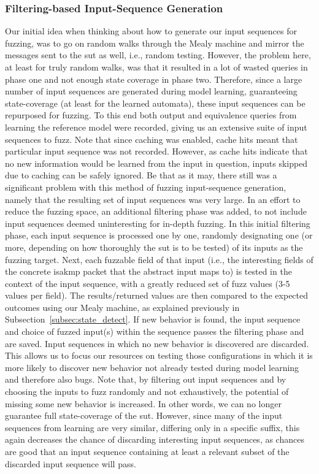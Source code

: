 \subsubsection{Filtering-based Input-Sequence Generation} \label{subsubsec:fuzz_filtering}
Our initial idea when thinking about how to generate our input sequences for fuzzing, was to go on random walks through the Mealy machine and mirror the messages sent to the \ac{sut} as well, i.e., random testing. However, the problem here, at least for truly random walks, was that it resulted in a lot of wasted queries in phase one and not enough state coverage in phase two. Therefore, since a large number of input sequences are generated during model learning, guaranteeing state-coverage (at least for the learned automata), these input sequences can be repurposed for fuzzing. To this end both output and equivalence queries from learning the reference model were recorded, giving us an extensive suite of input sequences to fuzz. Note that since caching was enabled, cache hits meant that particular input sequence was not recorded. However, as cache hits indicate that no new information would be learned from the input in question, inputs skipped due to caching can be safely ignored. Be that as it may, there still was a significant problem with this method of fuzzing input-sequence generation, namely that the resulting set of input sequences was very large. In an effort to reduce the fuzzing space, an additional filtering phase was added, to not include input sequences deemed uninteresting for in-depth fuzzing. In this initial filtering phase, each input sequence is processed one by one, randomly designating one (or more, depending on how thoroughly the \ac{sut} is to be tested) of its inputs as the fuzzing target. Next, each fuzzable field of that input (i.e., the interesting fields of the concrete \ac{isakmp} packet that the abstract input maps to) is tested in the context of the input sequence, with a greatly reduced set of fuzz values (3-5 values per field). The results/returned values are then compared to the expected outcomes using our Mealy machine, as explained previously in Subsection~\ref{subsec:state_detect}. If new behavior is found, the input sequence and choice of fuzzed input(s) within the sequence passes the filtering phase and are saved. Input sequences in which no new behavior is discovered are discarded. This allows us to focus our resources on testing those configurations in which it is more likely to discover new behavior not already tested during model learning and therefore also bugs.
Note that, by filtering out input sequences and by choosing the inputs to fuzz randomly and not exhaustively, the potential of missing some new behavior is increased. In other words, we can no longer guarantee full state-coverage of the \ac{sut}. However, since many of the input sequences from learning are very similar, differing only in a specific suffix, this again decreases the chance of discarding interesting input sequences, as chances are good that an input sequence containing at least a relevant subset of the discarded input sequence will pass. \\

